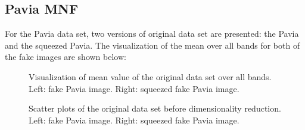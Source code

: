 \documentclass[conference,onecolumn]{IEEEtran}
\begin{document}
\subsection{Pavia MNF}

For the Pavia data set, two versions of original data set are presented: the Pavia and the squeezed Pavia. The visualization of the mean over all bands for both of the fake images are shown below:
\begin{figure}[H]
	\centering
	\qquad
	\caption{Visualization of mean value of the original data set over all bands. Left: fake Pavia image. Right: squeezed fake Pavia image.}
\end{figure}

\begin{figure}[H]
	\centering
	\qquad
	\caption{Scatter plots of the original data set before dimensionality reduction. Left: fake Pavia image. Right: squeezed fake Pavia image.}
\end{figure}
\end{document}
